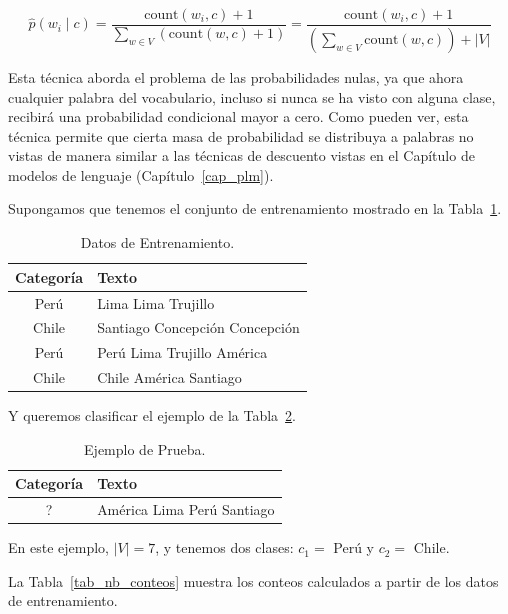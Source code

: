 \documentclass[11pt,fleqn]{book} %
\begin{document}
\[
\hat{p}(w_i \mid c) = \frac{\text{count}(w_i, c) + 1}{\sum_{w \in V} (\text{count}(w, c) + 1)} = \frac{\text{count}(w_i, c) + 1}{(\sum_{w \in V} \text{count}(w, c))+|V|}
\]

Esta técnica aborda el problema de las probabilidades nulas, ya que ahora cualquier palabra del vocabulario, incluso si nunca se ha visto con alguna clase, recibirá una probabilidad condicional mayor a cero. Como pueden ver, esta técnica permite que cierta masa de probabilidad se distribuya a palabras no vistas de manera similar a  las técnicas de descuento vistas en el Capítulo de modelos de lenguaje (Capítulo~\ref{cap_plm}).


\begin{example}

Supongamos que tenemos el conjunto de entrenamiento mostrado en la Tabla~\ref{tab_nb_train}.


\begin{table}[h]
\centering
\begin{tabular}{|c|p{}|}
\hline
\textbf{Categoría} & \textbf{Texto} \\
\hline
Perú & Lima Lima Trujillo \\
\hline
Chile & Santiago Concepción Concepción\\
\hline
Perú & Perú Lima Trujillo América\\
\hline
Chile & Chile América Santiago \\
\hline
\end{tabular}
\caption{Datos de Entrenamiento.}
\label{tab_nb_train}
\end{table}

Y queremos clasificar el ejemplo de la Tabla~\ref{tab_nb_test}.


\begin{table}[h]
\centering
\begin{tabular}{|c|p{}|}
\hline
\textbf{Categoría} & \textbf{Texto} \\
\hline
? & América Lima Perú Santiago \\
\hline
\end{tabular}
\caption{Ejemplo de Prueba.}
\label{tab_nb_test}
\end{table}

En este ejemplo, $|V|=7$, y tenemos dos clases: $c_1=$ Perú y $c_2=$ Chile.

La Tabla~\ref{tab_nb_conteos} muestra los conteos calculados a partir de los datos de entrenamiento.


\end{example}
\end{document}
